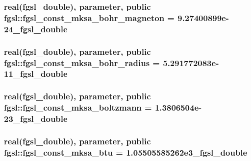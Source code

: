 \hypertarget{classfgsl_afa92cd1a7ffe8a0106c3ae29720b0f84}{
\subsubsection[{fgsl\-\_\-const\-\_\-mksa\-\_\-bohr\-\_\-magneton}]{\setlength{\rightskip}{0pt plus 5cm}real({\bf fgsl\-\_\-double}), parameter, public fgsl\-::fgsl\-\_\-const\-\_\-mksa\-\_\-bohr\-\_\-magneton = 9.\-27400899e-\/24\-\_\-fgsl\-\_\-double}}\label{classfgsl_afa92cd1a7ffe8a0106c3ae29720b0f84}
\hypertarget{classfgsl_a52a0f9900118e47b537d0ee98ba88780}{
\subsubsection[{fgsl\-\_\-const\-\_\-mksa\-\_\-bohr\-\_\-radius}]{\setlength{\rightskip}{0pt plus 5cm}real({\bf fgsl\-\_\-double}), parameter, public fgsl\-::fgsl\-\_\-const\-\_\-mksa\-\_\-bohr\-\_\-radius = 5.\-291772083e-\/11\-\_\-fgsl\-\_\-double}}\label{classfgsl_a52a0f9900118e47b537d0ee98ba88780}
\hypertarget{classfgsl_aee3fe8b4260b1d34436e9f66707b773e}{
\subsubsection[{fgsl\-\_\-const\-\_\-mksa\-\_\-boltzmann}]{\setlength{\rightskip}{0pt plus 5cm}real({\bf fgsl\-\_\-double}), parameter, public fgsl\-::fgsl\-\_\-const\-\_\-mksa\-\_\-boltzmann = 1.\-3806504e-\/23\-\_\-fgsl\-\_\-double}}\label{classfgsl_aee3fe8b4260b1d34436e9f66707b773e}
\hypertarget{classfgsl_a868742553429b50b469d7d21a481cc66}{
\subsubsection[{fgsl\-\_\-const\-\_\-mksa\-\_\-btu}]{\setlength{\rightskip}{0pt plus 5cm}real({\bf fgsl\-\_\-double}), parameter, public fgsl\-::fgsl\-\_\-const\-\_\-mksa\-\_\-btu = 1.\-05505585262e3\-\_\-fgsl\-\_\-double}}\label{classfgsl_a868742553429b50b469d7d21a481cc66}

